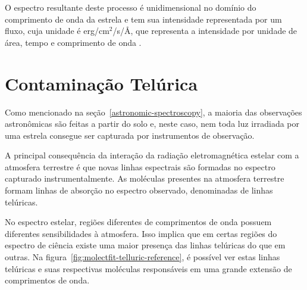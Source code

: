 O espectro resultante deste processo é unidimensional no domínio do comprimento de onda da estrela e tem sua intensidade representada por um fluxo, cuja unidade é erg/cm\(^{2}\)/s/Å, que representa a intensidade por unidade de área, tempo e comprimento de onda \citep{astronomical-measurements}.





\section{Contaminação Telúrica} \label{telluric-contamination}

Como mencionado na seção~\ref{astronomic-spectroscopy}, a maioria das observações astronômicas são feitas a partir do solo e, neste caso, nem toda luz irradiada por uma estrela consegue ser capturada por instrumentos de observação. 

A principal consequência da interação da radiação eletromagnética estelar com a atmosfera terrestre é que novas linhas espectrais são formadas no espectro capturado instrumentalmente. As moléculas presentes na atmosfera terrestre formam linhas de absorção no espectro observado, denominadas de linhas telúricas.  

No espectro estelar, regiões diferentes de comprimentos de onda possuem diferentes sensibilidades à atmosfera. Isso implica que em certas regiões do espectro de ciência existe uma maior presença das linhas telúricas do que em outras. Na figura~\ref{fig:molectfit-telluric-reference}, é possível ver estas linhas telúricas e suas respectivas moléculas responsáveis em uma grande extensão de comprimentos de onda.


